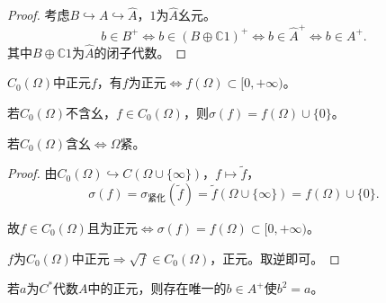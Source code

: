\documentclass[lang=cn,a4paper,newtx,section]{elegantbook}
\begin{document}
\begin{proof}
  考虑$B \hookrightarrow A \hookrightarrow \hat{A}$，$1$为$\hat{A}$幺元。
  \begin{equation*}
    b \in B^+ \Longleftrightarrow b \in (B \oplus \mathbb{C}1)^+ \Longleftrightarrow b \in \hat{A}^+ \Longleftrightarrow b \in A^+.
  \end{equation*}
  其中$B \oplus \mathbb{C}1$为$\hat{A}$的闭子代数。
\end{proof}

\begin{proposition}
  $C_0(\Omega)$中正元$f$，有$f$为正元$\Longleftrightarrow f(\Omega) \subset [0, +\infty)$。
\end{proposition}

\begin{remark}
  若$C_0(\Omega)$不含幺，$f \in C_0(\Omega)$，则$\sigma(f) = f(\Omega) \cup \{0\}$。
  
  若$C_0(\Omega)$含幺$\Longleftrightarrow \Omega$紧。
\end{remark}

\begin{proof}
  由$C_0(\Omega) \hookrightarrow C(\Omega \cup \{\infty\})$，$f \mapsto \tilde{f}$，
  \begin{equation*}
    \sigma(f) = \sigma_{\text{紧化}}(\tilde{f}) = \tilde{f}(\Omega \cup \{\infty\}) = f(\Omega) \cup \{0\}.
  \end{equation*}
  
  故$f \in C_0(\Omega)$且为正元$\Longleftrightarrow \sigma(f) = f(\Omega) \subset [0, +\infty)$。
  
  $f$为$C_0(\Omega)$中正元$\Rightarrow \sqrt{f} \in C_0(\Omega)$，正元。取逆即可。
\end{proof}

\begin{proposition}
  若$a$为$C^*$代数$A$中的正元，则存在唯一的$b \in A^+$使$b^2 = a$。
\end{proposition}
\end{document}
